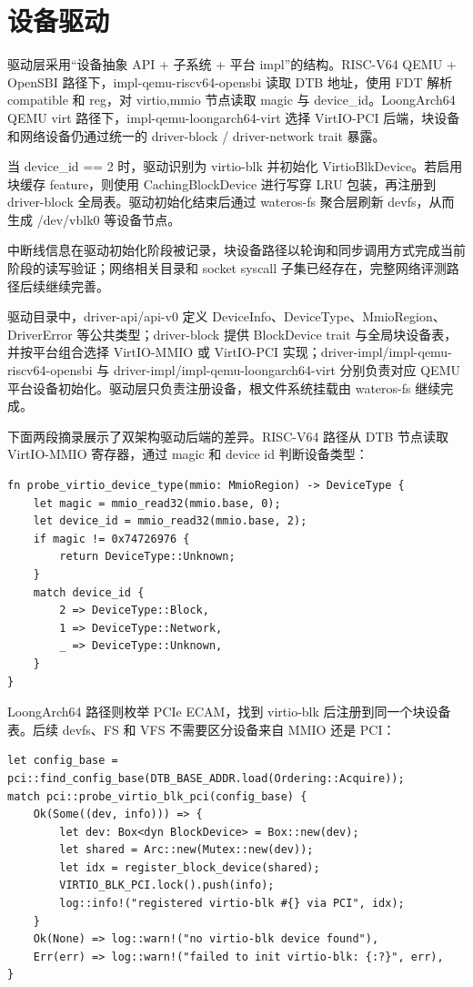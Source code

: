 \documentclass[12pt,openany,oneside,AutoFakeBold=true]{ctexbook}
\newcommand{\code}[1]{\textnormal{\rmfamily #1}}
\begin{document}
\section{设备驱动}

驱动层采用“设备抽象 API + 子系统 + 平台 impl”的结构。RISC-V64 QEMU + OpenSBI 路径下，\code{impl-qemu-riscv64-opensbi} 读取 DTB 地址，使用 FDT 解析 \code{compatible} 和 \code{reg}，对 \code{virtio,mmio} 节点读取 magic 与 \code{device\_id}。LoongArch64 QEMU virt 路径下，\code{impl-qemu-loongarch64-virt} 选择 VirtIO-PCI 后端，块设备和网络设备仍通过统一的 driver-block / driver-network trait 暴露。

当 \code{device\_id == 2} 时，驱动识别为 virtio-blk 并初始化 \code{VirtioBlkDevice}。若启用块缓存 feature，则使用 \code{CachingBlockDevice} 进行写穿 LRU 包装，再注册到 \code{driver-block} 全局表。驱动初始化结束后通过 \code{wateros-fs} 聚合层刷新 devfs，从而生成 \code{/dev/vblk0} 等设备节点。

中断线信息在驱动初始化阶段被记录，块设备路径以轮询和同步调用方式完成当前阶段的读写验证；网络相关目录和 socket syscall 子集已经存在，完整网络评测路径后续继续完善。

驱动目录中，\code{driver-api/api-v0} 定义 \code{DeviceInfo}、\code{DeviceType}、\code{MmioRegion}、\code{DriverError} 等公共类型；\code{driver-block} 提供 \code{BlockDevice} trait 与全局块设备表，并按平台组合选择 VirtIO-MMIO 或 VirtIO-PCI 实现；\code{driver-impl/impl-qemu-riscv64-opensbi} 与 \code{driver-impl/impl-qemu-loongarch64-virt} 分别负责对应 QEMU 平台设备初始化。驱动层只负责注册设备，根文件系统挂载由 \code{wateros-fs} 继续完成。


下面两段摘录展示了双架构驱动后端的差异。RISC-V64 路径从 DTB 节点读取 VirtIO-MMIO 寄存器，通过 magic 和 device id 判断设备类型：

\begin{lstlisting}
fn probe_virtio_device_type(mmio: MmioRegion) -> DeviceType {
    let magic = mmio_read32(mmio.base, 0);
    let device_id = mmio_read32(mmio.base, 2);
    if magic != 0x74726976 {
        return DeviceType::Unknown;
    }
    match device_id {
        2 => DeviceType::Block,
        1 => DeviceType::Network,
        _ => DeviceType::Unknown,
    }
}
\end{lstlisting}

LoongArch64 路径则枚举 PCIe ECAM，找到 virtio-blk 后注册到同一个块设备表。后续 devfs、FS 和 VFS 不需要区分设备来自 MMIO 还是 PCI：

\begin{lstlisting}
let config_base = pci::find_config_base(DTB_BASE_ADDR.load(Ordering::Acquire));
match pci::probe_virtio_blk_pci(config_base) {
    Ok(Some((dev, info))) => {
        let dev: Box<dyn BlockDevice> = Box::new(dev);
        let shared = Arc::new(Mutex::new(dev));
        let idx = register_block_device(shared);
        VIRTIO_BLK_PCI.lock().push(info);
        log::info!("registered virtio-blk #{} via PCI", idx);
    }
    Ok(None) => log::warn!("no virtio-blk device found"),
    Err(err) => log::warn!("failed to init virtio-blk: {:?}", err),
}
\end{lstlisting}
\end{document}
